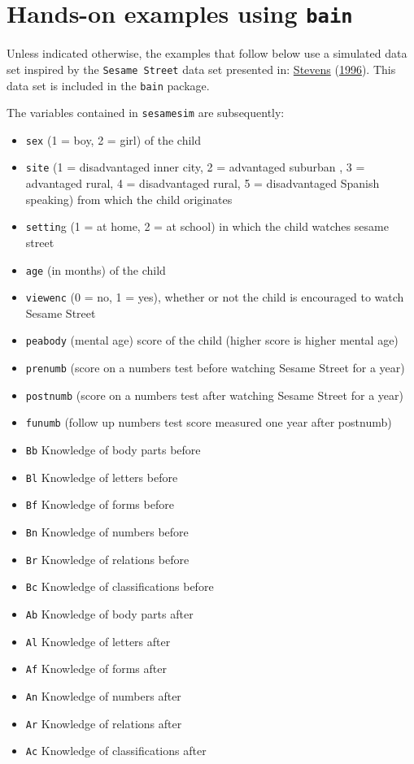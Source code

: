 \documentclass[
]{book}
\providecommand{\tightlist}{%
  \setlength{\itemsep}{0pt}\setlength{\parskip}{0pt}}
\begin{document}
\hypertarget{hands-on-examples-using-bain}{%
\chapter{\texorpdfstring{Hands-on examples using \texttt{bain}}{Hands-on examples using bain}}\label{hands-on-examples-using-bain}}

Unless indicated otherwise, the examples that follow below use a simulated
data set inspired by the \texttt{Sesame\ Street} data set presented in:
\protect\hyperlink{ref-stevens1996applied}{Stevens} (\protect\hyperlink{ref-stevens1996applied}{1996}). This data set is included in the
\texttt{bain} package.

The variables contained in \texttt{sesamesim} are subsequently:

\begin{itemize}
\tightlist
\item
  \texttt{sex} (1 = boy, 2 = girl) of the child
\item
  \texttt{site} (1 = disadvantaged inner city, 2 = advantaged suburban , 3 =
  advantaged rural,
  4 = disadvantaged rural, 5 = disadvantaged Spanish speaking) from which
  the child originates
\item
  \texttt{settin}g (1 = at home, 2 = at school) in which the child watches sesame
  street
\item
  \texttt{age} (in months) of the child
\item
  \texttt{viewenc} (0 = no, 1 = yes), whether or not the child is encouraged to
  watch Sesame Street
\item
  \texttt{peabody} (mental age) score of the child (higher score is higher mental
  age)
\item
  \texttt{prenumb} (score on a numbers test before watching Sesame Street for a
  year)
\item
  \texttt{postnumb} (score on a numbers test after watching Sesame Street for a
  year)
\item
  \texttt{funumb} (follow up numbers test score measured one year after postnumb)
\item
  \texttt{Bb} Knowledge of body parts before
\item
  \texttt{Bl} Knowledge of letters before
\item
  \texttt{Bf} Knowledge of forms before
\item
  \texttt{Bn} Knowledge of numbers before
\item
  \texttt{Br} Knowledge of relations before
\item
  \texttt{Bc} Knowledge of classifications before
\item
  \texttt{Ab} Knowledge of body parts after
\item
  \texttt{Al} Knowledge of letters after
\item
  \texttt{Af} Knowledge of forms after
\item
  \texttt{An} Knowledge of numbers after
\item
  \texttt{Ar} Knowledge of relations after
\item
  \texttt{Ac} Knowledge of classifications after
\end{itemize}
\end{document}

